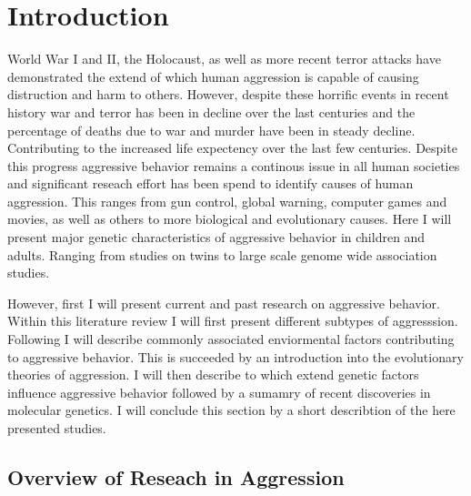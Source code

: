 \chapter{Introduction}
\label{cha:introduction}

World War I and II, the Holocaust, as well as more recent terror attacks have demonstrated the extend of which human aggression is capable of causing distruction and harm to others. 
However, despite these horrific events in recent history war and terror has been in decline over the last centuries %
and the percentage of deaths due to war and murder have been in steady decline.
Contributing to the increased life expectency over the last few centuries.
Despite this progress aggressive behavior remains a continous issue in all human societies and significant reseach effort has been spend to identify causes of human aggression.  
This ranges from gun control, global warning, computer games and movies, as well as others to more biological and evolutionary causes. %
Here I will present major genetic characteristics of aggressive behavior in children and adults.
Ranging from studies on twins to large scale genome wide association studies.

However, first I will present current and past research on aggressive behavior.
Within this literature review I will first present different subtypes of aggresssion.
Following I will describe commonly associated enviormental factors contributing to aggressive behavior.
This is succeeded by an introduction into the evolutionary theories of aggression.
I will then describe to which extend genetic factors influence aggressive behavior followed by a sumamry of recent discoveries in molecular genetics.
I will conclude this section by a short describtion of the here presented studies.

\section{Overview of Reseach in Aggression}
\label{sec:overview_of_reseach_in_aggression}

